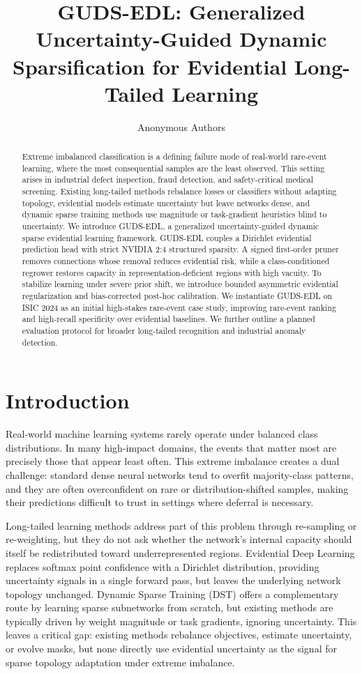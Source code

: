 \documentclass[letterpaper]{article} %
\title{GUDS-EDL: Generalized Uncertainty-Guided Dynamic Sparsification for Evidential Long-Tailed Learning}
\author{Anonymous Authors}
\begin{document}
\maketitle

\begin{abstract}
Extreme imbalanced classification is a defining failure mode of real-world rare-event learning, where the most consequential samples are the least observed. This setting arises in industrial defect inspection, fraud detection, and safety-critical medical screening. Existing long-tailed methods rebalance losses or classifiers without adapting topology, evidential models estimate uncertainty but leave networks dense, and dynamic sparse training methods use magnitude or task-gradient heuristics blind to uncertainty. We introduce GUDS-EDL, a generalized uncertainty-guided dynamic sparse evidential learning framework. GUDS-EDL couples a Dirichlet evidential prediction head with strict NVIDIA 2:4 structured sparsity. A signed first-order pruner removes connections whose removal reduces evidential risk, while a class-conditioned regrower restores capacity in representation-deficient regions with high vacuity. To stabilize learning under severe prior shift, we introduce bounded asymmetric evidential regularization and bias-corrected post-hoc calibration. We instantiate GUDS-EDL on ISIC 2024 as an initial high-stakes rare-event case study, improving rare-event ranking and high-recall specificity over evidential baselines. We further outline a planned evaluation protocol for broader long-tailed recognition and industrial anomaly detection.
\end{abstract}

\section{Introduction}
Real-world machine learning systems rarely operate under balanced class distributions. In many high-impact domains, the events that matter most are precisely those that appear least often. This extreme imbalance creates a dual challenge: standard dense neural networks tend to overfit majority-class patterns, and they are often overconfident on rare or distribution-shifted samples, making their predictions difficult to trust in settings where deferral is necessary.

Long-tailed learning methods address part of this problem through re-sampling or re-weighting, but they do not ask whether the network's internal capacity should itself be redistributed toward underrepresented regions. Evidential Deep Learning replaces softmax point confidence with a Dirichlet distribution, providing uncertainty signals in a single forward pass, but leaves the underlying network topology unchanged. Dynamic Sparse Training (DST) offers a complementary route by learning sparse subnetworks from scratch, but existing methods are typically driven by weight magnitude or task gradients, ignoring uncertainty. This leaves a critical gap: existing methods rebalance objectives, estimate uncertainty, or evolve masks, but none directly use evidential uncertainty as the signal for sparse topology adaptation under extreme imbalance.
\end{document}
